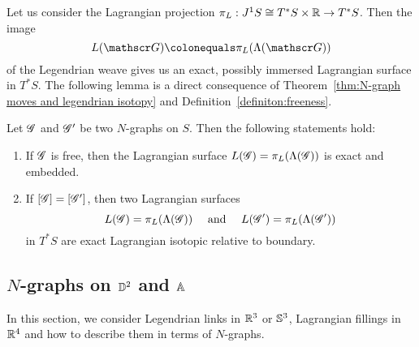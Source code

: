 \begin{comment}
By weaving the above local configurations near edges, vertices, and  a hexagonal point, we consider the following gradient vector fields $\nabla h_{12}$ and $\nabla h_{23}$ defined on $\mathring\disk^2\setminus(\ngraph_1\cup \ngraph_2)$.

Then, by the construction of gradients $\nabla h_{12}, \nabla h_{23}$ and the definition of Reeb chord, there are no Reeb chords connecting $\wavefront_i$ and $\wavefront_{i+1}$ for $i=1,2$. Now consider the the gradient flow lines of $h_{1\,2}+h_{2\,3}$ to see the Reeb chords from $\wavefront_1$ to $\wavefront_3$.
Without loss of generality, by tilting the slope of Legendrian sheets, we may assume that $\|\nabla h_{12}\|<\|\nabla h_{23}\|$ except on a sufficiently small neighborhood $U(\ngraph)$ of $\ngraph$. Hence the above gradients  $\nabla h_{12}, \nabla h_{23}$ induce a wavefront $\wavefront(\ngraph(a,b,c))$ without interior Reeb chords and we are done.
\end{proof}
\end{comment}


Let us consider the Lagrangian projection $\pi_L:J^1S\cong T^*S\times \mathbb{R} \to T^*S$.
Then the image 
\[
L(\ngraph)\colonequals\pi_L(\Legendrian(\ngraph))
\] 
of the Legendrian weave gives us an exact, possibly immersed Lagrangian surface in $T^*S$.
The following lemma is a direct consequence of Theorem~\ref{thm:N-graph moves and legendrian isotopy} and Definition~\ref{definiton:freeness}.
\begin{lemma}
Let $\mathscr{G}$ and $\mathscr{G}'$ be two $N$-graphs on $S$. Then the following statements hold:
\begin{enumerate}
\item If $\mathscr{G}$ is free, then the Lagrangian surface $L(\mathscr{G})=\pi_L(\Lambda(\mathscr{G}))$ is exact and embedded.
\item If $[\mathscr{G}]=[\mathscr{G}']$, then two Lagrangian surfaces
\[
L(\mathscr{G})=\pi_L(\Lambda(\mathscr{G}))\quad\text{ and }\quad
L(\mathscr{G}')=\pi_L(\Lambda(\mathscr{G}'))
\]
in $T^*S$ are exact Lagrangian isotopic relative to boundary.
\end{enumerate}
\end{lemma}


\subsection{\texorpdfstring{$N$-graphs on $\mathbb{D}^2$ and $\mathbb{A}$}{N-graphs on disk and annulus}}
In this section, we consider Legendrian links in $\mathbb{R}^3$ or $\mathbb{S}^3$, Lagrangian fillings in $\mathbb{R}^4$ and how to describe them in terms of $N$-graphs.

